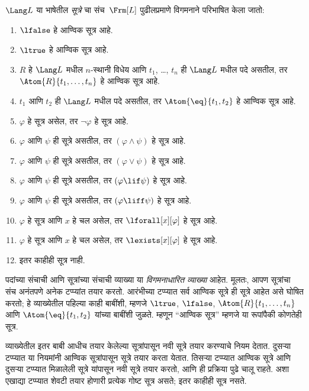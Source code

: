 \begin{defn}[सूत्रे]
\label{fol:syn:frm:defn:formulas}
$\Lang L$ या भाषेतील \emph{सूत्रे} चा संच~$\Frm[L]$
पुढीलप्रमाणे विगमनाने परिभाषित केला जातो:
\begin{enumerate}
\item $\lfalse$ हे आण्विक सूत्र आहे.

\item $\ltrue$ हे आण्विक सूत्र आहे.

\item $R$ हे $\Lang L$ मधील $n$-स्थानी विधेय आणि $t_1$, \dots,
  $t_n$ ही $\Lang L$ मधील पदे असतील, तर $\Atom{R}{t_1,\ldots, t_n}$ हे
  आण्विक सूत्र आहे.

\item $t_1$ आणि $t_2$ ही $\Lang L$ मधील पदे असतील, तर $\Atom{\eq}{t_1, t_2}$
  हे आण्विक सूत्र आहे.

\item $\varphi$ हे सूत्र असेल, तर $\lnot \varphi$ हे
  सूत्र आहे.

\item $\varphi$ आणि $\psi$ ही सूत्रे असतील, तर $(\varphi \land
  \psi)$ हे सूत्र आहे.

\item $\varphi$ आणि $\psi$ ही सूत्रे असतील, तर $(\varphi \lor \psi)$
  हे सूत्र आहे.

\item $\varphi$ आणि $\psi$ ही सूत्रे असतील, तर $(\varphi \lif \psi)$
  हे सूत्र आहे.

\item $\varphi$ आणि $\psi$ ही सूत्रे असतील, तर $(\varphi \liff \psi)$
  हे सूत्र आहे.

\item $\varphi$ हे सूत्र आणि $x$ हे चल असेल,
  तर $\lforall[x][\varphi]$ हे सूत्र आहे.

\item $\varphi$ हे सूत्र आणि $x$ हे चल असेल,
  तर $\lexists[x][\varphi]$ हे सूत्र आहे.

\item इतर काहीही सूत्र नाही.
\end{enumerate}
\end{defn}

\begin{explain}
पदांच्या संचाची आणि सूत्रांच्या संचाची व्याख्या या
\emph{विगमनाधारित व्याख्या} आहेत. मूलतः, आपण सूत्रांचा संच
अनंतपणे अनेक टप्प्यांत तयार करतो. आरंभीच्या टप्प्यात सर्व आण्विक सूत्रे
ही सूत्रे आहेत असे घोषित करतो; हे व्याख्येतील पहिल्या काही बाबींशी,
म्हणजे
$\ltrue$,
$\lfalse$,
$\Atom{R}{t_1,\dots,t_n}$ आणि $\Atom{\eq}{t_1,t_2}$ यांच्या बाबींशी जुळते.
म्हणून ``आण्विक सूत्र'' म्हणजे या रूपांपैकी कोणतेही सूत्र.

व्याख्येतील इतर बाबी आधीच तयार केलेल्या सूत्रांपासून नवी
सूत्रे तयार करण्याचे नियम देतात. दुसऱ्या टप्प्यात या नियमांनी
आण्विक सूत्रांपासून सूत्रे तयार करता येतात. तिसऱ्या
टप्प्यात आण्विक सूत्रे आणि दुसऱ्या टप्प्यात मिळालेली सूत्रे यांपासून
नवी सूत्रे तयार करतो, आणि ही प्रक्रिया पुढे चालू राहते. अशा एखाद्या
टप्प्यात शेवटी तयार होणारी प्रत्येक गोष्ट सूत्र असते; इतर
काहीही सूत्र नसते.
\end{explain}

